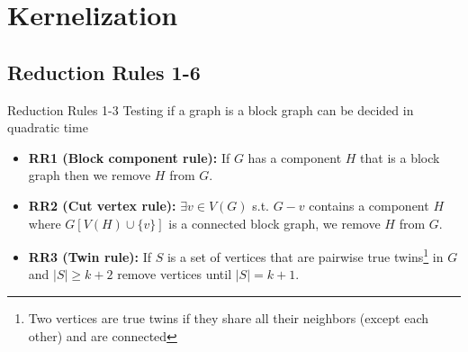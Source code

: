 \documentclass{beamer}
\begin{document}
\section{Kernelization}
\subsection{Reduction Rules 1-6}
\begin{frame}{Reduction Rules 1-3}
    Testing if a graph is a block graph can be decided in quadratic time~\cite{hopcroft_algorithm_1973}
    \vspace{-5pt}
    \begin{itemize}[<+->]
        \item \textbf{RR1 (Block component rule):} If \(G\) has a component \(H\) that is a block graph then we remove \(H\) from \(G\).
        \item \textbf{RR2 (Cut vertex rule):} \(\exists v\in V(G)\) s.t. \(G - v\) contains a component \(H\) where \(G[V(H) \cup \{v\}]\) is a connected block graph, we remove \(H\) from \(G\).
        \item \textbf{RR3 (Twin rule):} If \(S\) is a set of vertices that are pairwise true twins\footnote{Two vertices are true twins if they share all their neighbors (except each other) and are connected} in \(G\) and \(|S| \geq k+2\) remove vertices until \(|S| = k+1\).
    \end{itemize}
\end{frame}
    
\end{document}
